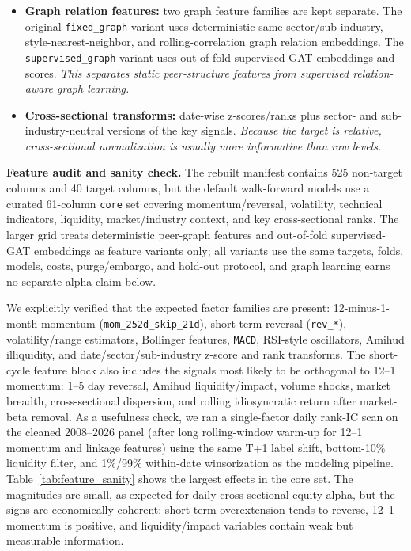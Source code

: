 \documentclass[9pt]{extarticle}
\begin{document}
\begin{itemize}
  \item \textbf{Graph relation features:} two graph feature families are kept
  separate. The original \texttt{fixed\_graph} variant uses deterministic
  same-sector/sub-industry, style-nearest-neighbor, and rolling-correlation graph
  relation embeddings. The \texttt{supervised\_graph} variant uses out-of-fold
  supervised GAT embeddings and scores. \emph{This separates static peer-structure
  features from supervised relation-aware graph learning.}
  \item \textbf{Cross-sectional transforms:} date-wise z-scores/ranks plus
  sector- and sub-industry-neutral versions of the key signals.
  \emph{Because the target is relative, cross-sectional normalization is usually
  more informative than raw levels.}
\end{itemize}

\textbf{Feature audit and sanity check.} The rebuilt manifest contains 525
non-target columns and 40 target columns, but the default walk-forward models
use a curated 61-column \texttt{core} set covering momentum/reversal,
volatility, technical indicators, liquidity, market/industry context, and key
cross-sectional ranks. The larger grid treats deterministic peer-graph features
and out-of-fold supervised-GAT embeddings as feature variants only; all variants
use the same targets, folds, models, costs, purge/embargo, and hold-out
protocol, and graph learning earns no separate alpha claim below.

We explicitly verified that the expected factor families are present:
12-minus-1-month momentum (\texttt{mom\_252d\_}\allowbreak\texttt{skip\_21d}), short-term reversal
(\texttt{rev\_*}), volatility/range estimators, Bollinger features,
\texttt{MACD}, RSI-style oscillators, Amihud illiquidity, and
date/sector/sub-industry z-score and rank transforms. The short-cycle feature
block also includes the signals most likely to be orthogonal to 12--1 momentum:
1--5 day reversal, Amihud liquidity/impact, volume shocks, market breadth,
cross-sectional dispersion, and rolling idiosyncratic return after market-beta
removal. As a usefulness check, we
ran a single-factor daily rank-IC scan on the cleaned 2008--2026 panel (after
long rolling-window warm-up for 12--1 momentum and linkage features) using the
same T+1 label shift, bottom-10\% liquidity filter, and 1\%/99\% within-date
winsorization as the modeling pipeline. Table~\ref{tab:feature_sanity} shows the
largest effects in the core set. The magnitudes are small, as expected for daily
cross-sectional equity alpha, but the signs are economically coherent: short-term
overextension tends to reverse, 12--1 momentum is positive, and liquidity/impact
variables contain weak but measurable information.
\end{document}
